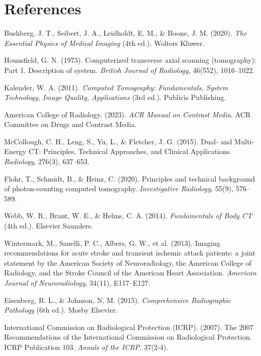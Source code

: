 \documentclass[11pt,a4paper]{article}
\begin{document}
\section*{References}

\begin{enumerate}[label={[\arabic*]},leftmargin=*]
    \item Bushberg, J. T., Seibert, J. A., Leidholdt, E. M., \& Boone, J. M. (2020). \textit{The Essential Physics of Medical Imaging} (4th ed.). Wolters Kluwer.
    \item Hounsfield, G. N. (1973). Computerized transverse axial scanning (tomography): Part 1. Description of system. \textit{British Journal of Radiology}, 46(552), 1016--1022.
    \item Kalender, W. A. (2011). \textit{Computed Tomography: Fundamentals, System Technology, Image Quality, Applications} (3rd ed.). Publicis Publishing.
    \item American College of Radiology. (2023). \textit{ACR Manual on Contrast Media}. ACR Committee on Drugs and Contrast Media.
    \item McCollough, C. H., Leng, S., Yu, L., \& Fletcher, J. G. (2015). Dual- and Multi-Energy CT: Principles, Technical Approaches, and Clinical Applications. \textit{Radiology}, 276(3), 637--653.
    \item Flohr, T., Schmidt, B., \& Heinz, C. (2020). Principles and technical background of photon-counting computed tomography. \textit{Investigative Radiology}, 55(9), 576--589.
    \item Webb, W. R., Brant, W. E., \& Helms, C. A. (2014). \textit{Fundamentals of Body CT} (4th ed.). Elsevier Saunders.
    \item Wintermark, M., Sanelli, P. C., Albers, G. W., et al. (2013). Imaging recommendations for acute stroke and transient ischemic attack patients: a joint statement by the American Society of Neuroradiology, the American College of Radiology, and the Stroke Council of the American Heart Association. \textit{American Journal of Neuroradiology}, 34(11), E117--E127.
    \item Eisenberg, R. L., \& Johnson, N. M. (2015). \textit{Comprehensive Radiographic Pathology} (6th ed.). Mosby Elsevier.
    \item International Commission on Radiological Protection (ICRP). (2007). The 2007 Recommendations of the International Commission on Radiological Protection. ICRP Publication 103. \textit{Annals of the ICRP}, 37(2-4).
\end{enumerate}
\end{document}
